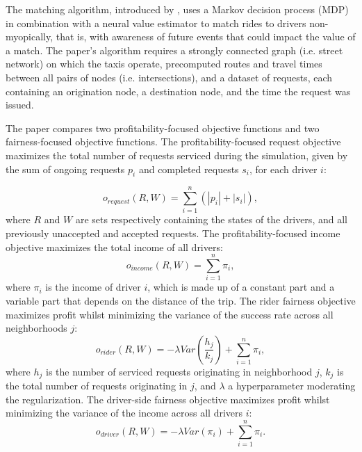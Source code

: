 The matching algorithm, introduced by \cite{shah_neural_2019}, uses a Markov decision process (MDP) in combination with a neural value estimator to match rides to drivers non-myopically, that is, with awareness of future events that could impact the value of a match. The paper's algorithm requires a strongly connected graph (i.e. street network) on which the taxis operate, precomputed routes and travel times between all pairs of nodes (i.e. intersections), and a dataset of requests, each containing an origination node, a destination node, and the time the request was issued.

The paper compares two profitability-focused objective functions and two fairness-focused objective functions. The profitability-focused request objective maximizes the total number of requests serviced during the simulation, given by the sum of ongoing requests $p_i$ and completed requests $s_i$, for each driver $i$:

\begin{equation}
    \label{eq:requestobj}
    o_{\textit{request}}(R,W)=\sum_{i=1}^{n}(|p_i|+|s_i|),
\end{equation} where $R$ and $W$ are sets respectively containing the states of the drivers, and all previously unaccepted and accepted requests. The profitability-focused income objective maximizes the total income of all drivers:
\begin{equation}
    \label{eq:incomeobj}
    o_{\textit{income}}(R,W)=\sum_{i=1}^{n}\pi_i,
\end{equation} where $\pi_i$ is the income of driver $i$, which is made up of a constant part and a variable part that depends on the distance of the trip.
The rider fairness objective maximizes profit whilst minimizing the variance of the success rate across all neighborhoods $j$:
\begin{equation}
    \label{eq:riderobj}
    o_{\textit{rider}}(R,W)=-\lambda Var(\frac{h_j}{k_j})+\sum_{i=1}^n \pi_i,
\end{equation}
where $h_j$ is the number of serviced requests originating in neighborhood $j$, $k_j$ is the total number of requests originating in $j$, and $\lambda$ a hyperparameter moderating the regularization. The driver-side fairness objective maximizes profit whilst minimizing the variance of the income across all drivers $i$:
\begin{equation}
    \label{eq:driverobj}
    o_{\textit{driver}}(R,W)=-\lambda Var(\pi_i)+\sum_{i=1}^n \pi_i.
\end{equation}


